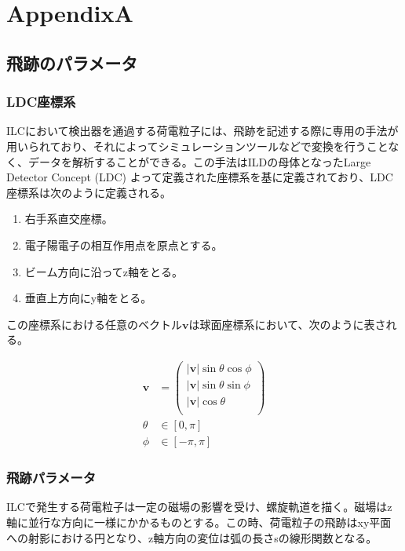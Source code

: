 
\appendix 

\chapter{AppendixA} \label{sec:Appendix}
\section{飛跡のパラメータ}
\subsection{LDC座標系}
ILCにおいて検出器を通過する荷電粒子には、飛跡を記述する際に専用の手法が用いられており、それによってシミュレーションツールなどで変換を行うことなく、データを解析することができる。この手法はILDの母体となったLarge Detector Concept (LDC) よって定義された座標系\cite{ldc}を基に定義されており、LDC座標系は次のように定義される。
\begin{enumerate}
\item 右手系直交座標。
\item 電子陽電子の相互作用点を原点とする。
\item ビーム方向に沿ってz軸をとる。
\item 垂直上方向にy軸をとる。
\end{enumerate}

この座標系における任意のベクトル$\bm{v}$は球面座標系において、次のように表される。

\begin{align}
\mathbf{v} &= \left(
\begin{array}{c}
|\mathbf{v}| \sin \theta \cos \phi \\
|\mathbf{v}| \sin \theta \sin \phi \\
|\mathbf{v}| \cos \theta \\
\end{array}
\right) \\
\nonumber \theta& \in [0,\pi ] \\
\nonumber \phi &\in [-\pi , \pi ]
\end{align}

\subsection{飛跡パラメータ}
ILCで発生する荷電粒子は一定の磁場の影響を受け、螺旋軌道を描く。磁場はz軸に並行な方向に一様にかかるものとする。この時、荷電粒子の飛跡はxy平面への射影における円となり、z軸方向の変位は弧の長さsの線形関数となる。

